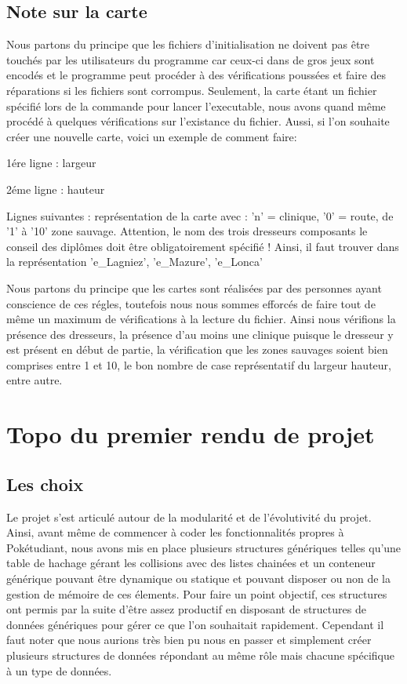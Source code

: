 \documentclass[10pt,a4paper,twocolumn]{report}
\begin{document}
\section{Note sur la carte}
Nous partons du principe que les fichiers d'initialisation ne doivent pas être touchés par les utilisateurs du programme car ceux-ci dans de gros jeux sont encodés et le programme peut procéder à des vérifications poussées et faire des réparations si les fichiers sont corrompus. Seulement, la carte étant un fichier spécifié lors de la commande pour lancer l'executable, nous avons quand même procédé à quelques vérifications sur l'existance du fichier. Aussi, si l'on souhaite créer une nouvelle carte, voici un exemple de comment faire:


1ére ligne : largeur

2éme ligne : hauteur

Lignes suivantes : représentation de la carte avec : 'n' = clinique, '0' = route, de '1' à '10' zone sauvage.
Attention, le nom des trois dresseurs composants le conseil des diplômes doit être obligatoirement spécifié ! Ainsi, il faut trouver dans la représentation 'e\_Lagniez', 'e\_Mazure', 'e\_Lonca'


Nous partons du principe que les cartes sont réalisées par des personnes ayant conscience de ces régles, toutefois nous nous sommes efforcés de faire tout de même un maximum de vérifications à la lecture du fichier. Ainsi nous vérifions la présence des dresseurs, la présence d'au moins une clinique puisque le dresseur y est présent en début de partie, la vérification que les zones sauvages soient bien comprises entre 1 et 10, le bon nombre de case représentatif du largeur \* hauteur, entre autre.

\chapter{Topo du premier rendu de projet}

\section{Les choix}

Le projet s'est articulé autour de la modularité et de l'évolutivité du projet.
Ainsi, avant même de commencer à coder les fonctionnalités propres à Pokétudiant, nous avons
mis en place plusieurs structures génériques telles qu'une table de hachage gérant les collisions avec des listes chainées et un conteneur générique pouvant être dynamique ou statique et pouvant disposer ou non de la gestion de mémoire de ces élements.
Pour faire un point objectif, ces structures ont permis par la suite d'être assez productif en disposant de structures de données génériques pour gérer ce que l'on souhaitait rapidement. Cependant il faut noter que nous aurions très bien pu nous en passer et simplement créer plusieurs structures de données répondant au même rôle mais chacune spécifique à un type de données.
\end{document}
